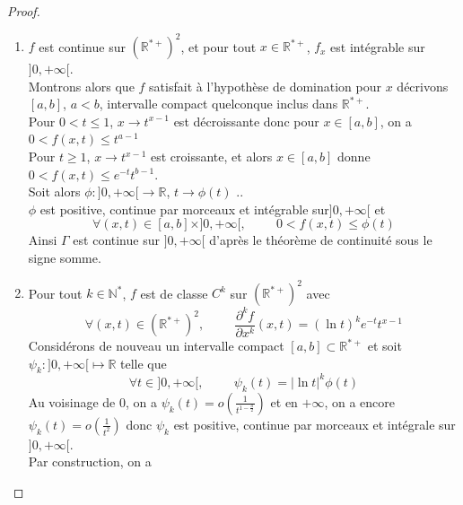 \begin{proof}
    \begin{enumerate}
        \item $f$ est continue sur $(\mathbb{R^{*+}})^2$, et pour tout $x\in \mathbb{R^{*+}}$, $f_x$ est intégrable sur $]0,+\infty[$. \\
        Montrons alors que $f$ satisfait à l'hypothèse de domination pour $x$ décrivons $[a,b]$, $a<b$, intervalle compact quelconque inclus dans $\mathbb{R^{*+}}$.\\ 
        Pour $0<t\leq 1$, $x \to t^{x-1}$ est décroissante donc pour $x\in [a,b]$, on a $0<f(x,t)\leq t^{a-1}$\\
        Pour $t\geq1$, $x\to t^{x-1}$ est croissante, et alors $x\in [a,b]$ donne $0<f(x,t)\leq e^{-t} t^{b-1}$.\\
        Soit alors $\phi:]0,+\infty[ \to \mathbb{R}$, $t \to \phi(t)$ ..\\
        $\phi$ est positive, continue par morceaux et intégrable sur$]0,+\infty[$ et 
        \begin{equation*}
            \forall(x,t)\in [a,b] \times ]0,+\infty[, \hspace{1cm} 0<f(x,t)\leq \phi(t)
        \end{equation*}
        Ainsi $\Gamma$ est continue sur $]0,+\infty[$ d'après le théorème de continuité sous le signe somme.
        \item Pour tout $k \in \mathbb{N^*}$, $f$ est de classe $C^k$ sur $(\mathbb{R^{*+}})^2$ avec \\
        \begin{equation*}
            \forall(x,t)\in(\mathbb{R^{*+}})^2, \hspace{1cm} \frac{\partial ^k f}{\partial x^k}(x,t)=(\ln t)^k e^{-t} t^{x-1}
        \end{equation*}  
        Considérons de nouveau un intervalle compact $[a,b]\subset \mathbb{R^{*+}}$ et soit $\psi _k : ]0,+\infty[ \mapsto \mathbb{R}$ telle que
        \begin{equation*}
            \forall t\in ]0,+\infty[, \hspace{1cm} \psi_k (t) = |\ln t|^k \phi(t)
        \end{equation*}
        Au voisinage de 0, on a $\psi_k (t) = o\left(\frac{1}{t^{1-\frac{a}{2}}} \right)$ et en $+\infty$, on a encore $\psi _k (t) = o\left(\frac{1}{t^2}\right)$ donc $\psi_k$ est positive, continue par morceaux et intégrale sur $]0,+\infty[$.\\
        Par construction, on a 

\end{enumerate}
\end{proof}
